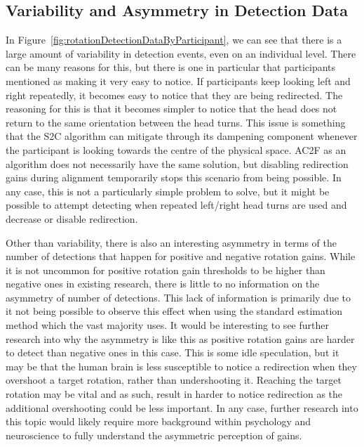 \subsection{Variability and Asymmetry in Detection Data}
In Figure~\ref{fig:rotationDetectionDataByParticipant}, we can see that there is a large amount of variability in detection events, even on an individual level. There can be many reasons for this, but there is one in particular that participants mentioned as making it very easy to notice. If participants keep looking left and right repeatedly, it becomes easy to notice that they are being redirected. The reasoning for this is that it becomes simpler to notice that the head does not return to the same orientation between the head turns. This issue is something that the S2C algorithm can mitigate through its dampening component whenever the participant is looking towards the centre of the physical space. AC2F as an algorithm does not necessarily have the same solution, but disabling redirection gains during alignment temporarily stops this scenario from being possible. In any case, this is not a particularly simple problem to solve, but it might be possible to attempt detecting when repeated left/right head turns are used and decrease or disable redirection. 

Other than variability, there is also an interesting asymmetry in terms of the number of detections that happen for positive and negative rotation gains. While it is not uncommon for positive rotation gain thresholds to be higher than negative ones in existing research, there is little to no information on the asymmetry of number of detections. This lack of information is primarily due to it not being possible to observe this effect when using the standard estimation method which the vast majority uses. It would be interesting to see further research into why the asymmetry is like this as positive rotation gains are harder to detect than negative ones in this case. This is some idle speculation, but it may be that the human brain is less susceptible to notice a redirection when they overshoot a target rotation, rather than undershooting it. Reaching the target rotation may be vital and as such, result in harder to notice redirection as the additional overshooting could be less important. In any case, further research into this topic would likely require more background within psychology and neuroscience to fully understand the asymmetric perception of gains. 


